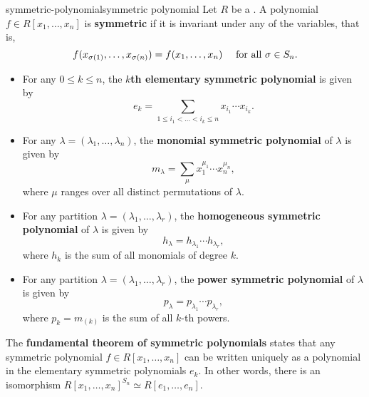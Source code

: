 \begin{topic}{symmetric-polynomial}{symmetric polynomial}
    Let $R$ be a . A polynomial $f \in R[x_1, \ldots, x_n]$ is \textbf{symmetric} if it is invariant under any  of the variables, that is,
    \[ f(x_{\sigma(1)}, \ldots, x_{\sigma(n)}) = f(x_1, \ldots, x_n) \quad \textup{ for all } \sigma \in S_n . \]
    \begin{itemize}
        \item For any $0 \le k \le n$, the \textbf{$k$th elementary symmetric polynomial} is given by
        \[ e_k = \sum_{1 \le i_1 < \ldots < i_k \le n} x_{i_1} \cdots x_{i_k} . \]
        \item For any  $\lambda = (\lambda_1, \ldots, \lambda_n)$, the \textbf{monomial symmetric polynomial} of $\lambda$ is given by
        \[ m_\lambda = \sum_{\mu} x_1^{\mu_1} \cdots x_n^{\mu_n} , \]
        where $\mu$ ranges over all distinct permutations of $\lambda$.
        \item For any partition $\lambda = (\lambda_1, \ldots, \lambda_r)$, the \textbf{homogeneous symmetric polynomial} of $\lambda$ is given by
        \[ h_\lambda = h_{\lambda_1} \cdots h_{\lambda_r} , \]
        where $h_k$ is the sum of all monomials of degree $k$.
        \item For any partition $\lambda = (\lambda_1, \ldots, \lambda_r)$, the \textbf{power symmetric polynomial} of $\lambda$ is given by
        \[ p_\lambda = p_{\lambda_1} \cdots p_{\lambda_r} , \]
        where $p_k = m_{(k)}$ is the sum of all $k$-th powers.
    \end{itemize}
    The \textbf{fundamental theorem of symmetric polynomials} states that any symmetric polynomial $f \in R[x_1, \ldots, x_n]$ can be written uniquely as a polynomial in the elementary symmetric polynomials $e_k$. In other words, there is an isomorphism $R[x_1, \ldots, x_n]^{S_n} \simeq R[e_1, \ldots, e_n]$.
\end{topic}

